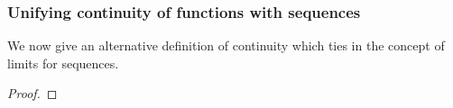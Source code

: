 \documentclass[MathsNotesBase.tex]{subfiles}
\begin{document}
{		\subsubsection{Unifying continuity of functions with sequences}
		We now give an alternative definition of continuity which ties in the concept of limits for sequences.
		\begin{proof}
		\end{proof}
	}
\end{document}
